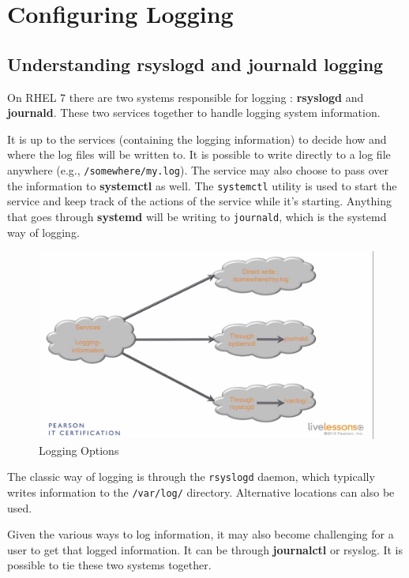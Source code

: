 \chapter{Configuring Logging}

\section{Understanding rsyslogd and journald logging}
On RHEL 7 there are two systems responsible for logging : \textbf{rsyslogd} and \textbf{journald}. These two services together to handle logging system information. 

It is up to the services (containing the logging information) to decide how and where the log files will be written to. It is possible to write directly to a log file anywhere (e.g., \verb|/somewhere/my.log|). The service may also choose to pass over the information to \textbf{systemctl} as well. The \verb|systemctl| utility is used to start the service and keep track of the actions of the service while it's starting. Anything that goes through \textbf{systemd} will be writing to \verb|journald|, which is the systemd way of logging. 

\begin{figure}[H]
	\centering
	\includegraphics[width=0.9\linewidth]{Mod2/chapters/2.14.a}
	\caption{Logging Options}
	\label{fig:2 Logging Options}
\end{figure}


\noindent
The classic way of logging is through the \verb|rsyslogd| daemon, which typically writes information to the \verb|/var/log/| directory. Alternative locations can also be used. 

Given the various ways to log information, it may also become challenging for a user to get that logged information. It can be through \textbf{journalctl} or rsyslog. It is possible to tie these two systems together.

